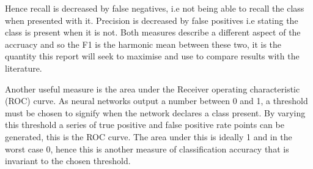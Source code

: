 Hence recall is decreased by false negatives, i.e not being able to recall the class
when presented with it. Precision is decreased by false positives i.e stating the class
is present when it is not. Both measures describe a different aspect of the accruacy and so the F1 is the
harmonic mean between these two, it is the quantity this report will seek to maximise and use to compare
results with the literature.

Another useful measure is the area under the Receiver operating characteristic (ROC) curve.
As neural networks output a number between 0 and 1, a threshold must be chosen to signify
when the network declares a class present. By varying this threshold a series of true positive and false positive rate points
can be generated, this is the ROC curve. The area under this is ideally 1 and in the worst case 0, hence this is
another measure of classification accuracy that is invariant to the chosen threshold.
